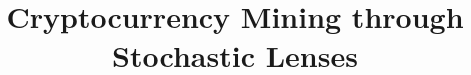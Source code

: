 \documentclass[sigconf,nonacm]{acmart}
\begin{document}
\title{Cryptocurrency Mining through Stochastic Lenses}



\maketitle










\newpage
\onecolumn
\appendix


\end{document}
